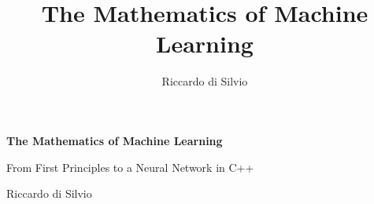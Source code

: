 \documentclass[12pt, a4paper]{report}
\title{\Huge\bfseries The Mathematics of Machine Learning}
\author{\Large Riccardo di Silvio}
\begin{document}
\begin{titlepage}
	\centering
	\vspace*{3cm}
	{\Huge\bfseries The Mathematics of Machine Learning\par}
	\vspace{0.8cm}
	{\Large From First Principles to a Neural Network in C++\par}
	\vspace{2.5cm}
	{\Large Riccardo di Silvio}
	\vfill
\end{titlepage}

\tableofcontents


\clearpage
{}











\end{document}
